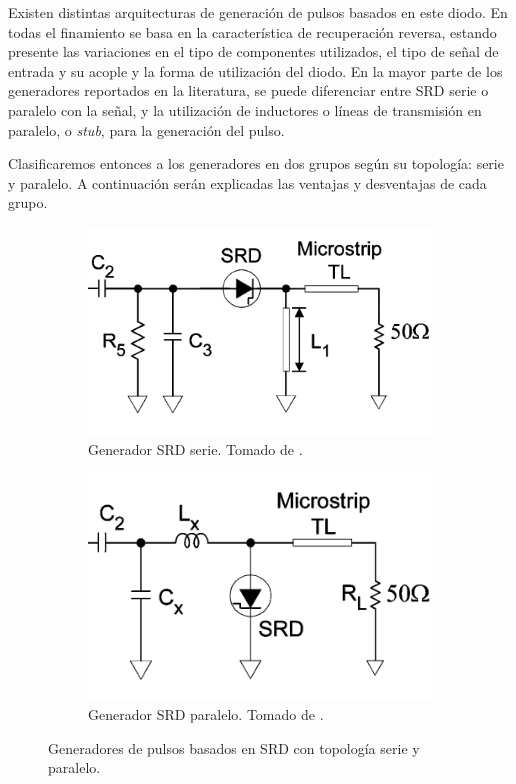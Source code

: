 Existen distintas arquitecturas de generación de pulsos basados en este diodo.
En todas el finamiento se basa en la característica de recuperación reversa,
estando presente las variaciones en el tipo de componentes utilizados, el tipo
de señal de entrada y su acople y la forma de utilización del diodo. En la mayor
parte de los generadores reportados en la literatura, se puede diferenciar entre
SRD serie o paralelo con la señal, y la utilización de inductores o líneas de
transmisión en paralelo, o \textit{stub}, para la generación del pulso.

Clasificaremos entonces a los generadores en dos grupos según su topología:
serie y paralelo. A continuación serán explicadas las ventajas y desventajas de
cada grupo.

\begin{figure}
    \centering
    \begin{subfigure}[b]{0.45\textwidth}
        \centering
        \includegraphics[width=\textwidth]{images/srd_series_generator.png}
        \caption{Generador SRD serie. Tomado de \cite{han2005}.}
        \label{fig:srd_series_generator}
    \end{subfigure}
    \hfill
    \begin{subfigure}[b]{0.45\textwidth}
        \centering
        \includegraphics[width=\textwidth]{images/srd_shunt_generator.png}
        \caption{Generador SRD paralelo. Tomado de \cite{han2005}.}
        \label{fig:srd_shunt_generator}
    \end{subfigure}
    \caption{Generadores de pulsos basados en SRD con topología serie y
    paralelo.}
    \label{fig:srd_pulse_generator_topologies}
\end{figure}

